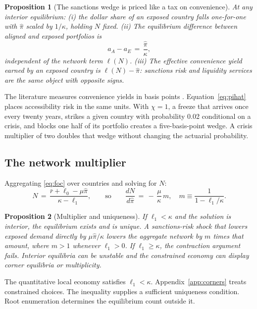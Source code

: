 \documentclass[11pt]{article}
\newtheorem{proposition}{Proposition}
\theoremstyle{definition}
\begin{document}
\begin{proposition}[The sanctions wedge is priced like a tax on convenience]\label{prop:pricing}
At any interior equilibrium: (i) the dollar share of an exposed country falls one-for-one with $\hat\pi$ scaled by $1/\kappa$, holding $N$ fixed. (ii) The equilibrium difference between aligned and exposed portfolios is
\[
a_A - a_E \,=\, \frac{\hat\pi}{\kappa},
\]
independent of the network term $\ell(N)$. (iii) The effective convenience yield earned by an exposed country is $\ell(N) - \hat\pi$: sanctions risk and liquidity services are the same object with opposite signs.
\end{proposition}

The literature measures convenience yields in basis points \citep{KrishnamurthyVissingJorgensen2012, DuImSchreger2018}. Equation~\eqref{eq:pihat} places accessibility risk in the same units. With $\chi=1$, a freeze that arrives once every twenty years, strikes a given country with probability 0.02 conditional on a crisis, and blocks one half of its portfolio creates a five-basis-point wedge. A crisis multiplier of two doubles that wedge without changing the actuarial probability.

\subsection{The network multiplier}

Aggregating \eqref{eq:foc} over countries and solving for $N$:
\begin{equation}
N \,=\, \frac{\bar r + \ell_0 - \mu \hat\pi}{\kappa - \ell_1},
\qquad\text{so}\qquad
\frac{dN}{d\hat\pi} \,=\, -\,\frac{\mu}{\kappa}\, m,
\quad
m \equiv \frac{1}{1 - \ell_1/\kappa}.
\label{eq:Nss}
\end{equation}

\begin{proposition}[Multiplier and uniqueness]\label{prop:multiplier}
If $\ell_1 < \kappa$ and the solution is interior, the equilibrium exists and is unique. A sanctions-risk shock that lowers exposed demand directly by $\mu\hat\pi/\kappa$ lowers the aggregate network by $m$ times that amount, where $m>1$ whenever $\ell_1>0$. If $\ell_1 \geq \kappa$, the contraction argument fails. Interior equilibria can be unstable and the constrained economy can display corner equilibria or multiplicity.
\end{proposition}

The quantitative local economy satisfies $\ell_1<\kappa$. Appendix~\ref{app:corners} treats constrained choices. The inequality supplies a sufficient uniqueness condition. Root enumeration determines the equilibrium count outside it.
\end{document}
